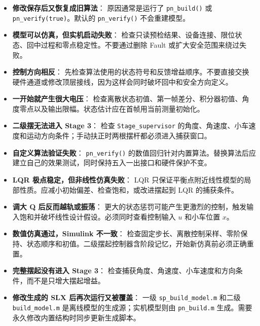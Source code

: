 \documentclass[12pt,a4paper]{article}
\begin{document}
\begin{itemize}

    \item \textbf{修改保存后又恢复成旧算法}： 原因通常是运行了 \texttt{pn\_build()} 或 \texttt{pn\_verify(true)}。默认的 \texttt{pn\_verify()} 不会重建模型。

    \item \textbf{模型可以仿真，但实机启动失败}： 检查只读预检结果、设备连接、限位状态、回中过程和零点稳定性。不要通过删除 Fault 或扩大安全范围来绕过失败。

    \item \textbf{控制方向相反}： 先检查算法使用的状态符号和反馈增益顺序。不要直接交换硬件通道或修改顶层接线，因为这样会同时破坏回中和安全方向定义。

    \item \textbf{一开始就产生很大电压}： 检查离散状态初值、第一帧差分、积分器初值、角度零点以及输出限幅。状态估计应在首帧用当前测量初始化。

    \item \textbf{二级摆无法进入 Stage 3}： 检查 \texttt{Stage\_supervisor} 的角度、角速度、小车速度和运动方向条件；手动扶正时两根摆杆都必须进入捕获窗口。

    \item \textbf{自定义算法验证失败}： \texttt{pn\_verify()} 的数值回归针对内置算法。替换算法后应建立自己的效果测试，同时保持五入一出接口和硬件保护不变。

    \item \textbf{LQR 极点稳定，但非线性仿真失败}： LQR 只保证平衡点附近线性模型的局部性质。应减小初始偏差、检查饱和，或改进摆起到 LQR 的捕获条件。

    \item \textbf{调大 Q 后反而越轨或振荡}： 更大的状态惩罚可能产生更激烈的控制，触发输入饱和并破坏线性设计假设。必须同时查看控制输入 $u$ 和小车位置 $x$。

    \item \textbf{数值仿真通过，Simulink 不一致}： 检查固定步长、离散控制采样、零阶保持、状态顺序和初值。二级摆起控制器含阶段记忆，开始新仿真前必须正确重置。

    \item \textbf{完整摆起没有进入 Stage 3}： 检查捕获角度、角速度、小车速度和方向条件，而不是只增大摆起增益。

    \item \textbf{修改生成的 SLX 后再次运行又被覆盖}： 一级 \texttt{sp\_build\_model.m} 和二级 \texttt{build\_model.m} 是离线模型的生成源；实机模型则由 \texttt{pn\_build.m} 生成。需要永久修改内置结构时同步更新生成脚本。

\end{itemize}
\end{document}
